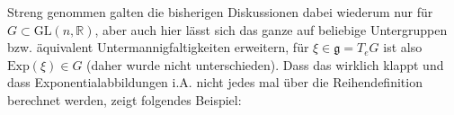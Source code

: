 \documentclass[../H_Analysis_main.tex]{subfiles}
\begin{document}

Streng genommen galten die bisherigen Diskussionen dabei wiederum nur für $G \subset \text{GL}(n, \mathbb{R})$, aber auch hier lässt sich das ganze auf beliebige Untergruppen bzw. äquivalent Untermannigfaltigkeiten erweitern, für $\xi \in \mathfrak{g} = T_e G$ ist also $\text{Exp}(\xi) \in G$ (daher wurde nicht unterschieden). Dass das wirklich klappt und dass Exponentialabbildungen i.A. nicht jedes mal über die Reihendefinition berechnet werden, zeigt folgendes Beispiel:
\end{document}
